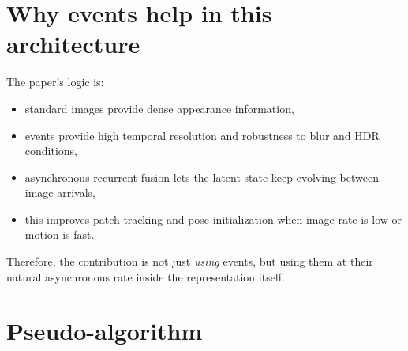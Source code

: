 \documentclass[11pt]{article}
\begin{document}
\section{Why events help in this architecture}

The paper's logic is:
\begin{itemize}
    \item standard images provide dense appearance information,
    \item events provide high temporal resolution and robustness to blur and HDR conditions,
    \item asynchronous recurrent fusion lets the latent state keep evolving between image arrivals,
    \item this improves patch tracking and pose initialization when image rate is low or motion is fast.
\end{itemize}
Therefore, the contribution is not just \emph{using} events, but using them at their natural asynchronous rate inside the representation itself.

\section{Pseudo-algorithm}
\end{document}
